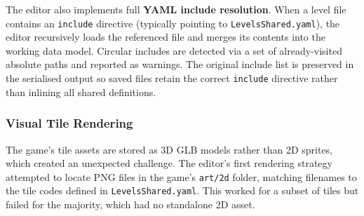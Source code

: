 \begin{Shaded}
\begin{Highlighting}[]
     
\OperatorTok{=}
        \OperatorTok{=}
     
\OperatorTok{=}
    \NormalTok{:}
\OperatorTok{=}

\StringTok{\textquotesingle{}!\textquotesingle{}}\OperatorTok{=}
\end{Highlighting}
\end{Shaded}

The editor also implements full \textbf{YAML include resolution}. When a
level file contains an \texttt{include} directive (typically pointing to
\texttt{LevelsShared.yaml}), the editor recursively loads the referenced
file and merges its contents into the working data model. Circular
includes are detected via a set of already-visited absolute paths and
reported as warnings. The original include list is preserved in the
serialised output so saved files retain the correct \texttt{include}
directive rather than inlining all shared definitions.

\subsubsection{Visual Tile Rendering}\label{visual-tile-rendering}

The game's tile assets are stored as 3D GLB models rather than 2D
sprites, which created an unexpected challenge. The editor's first
rendering strategy attempted to locate PNG files in the game's
\texttt{art/2d} folder, matching filenames to the tile codes defined in
\texttt{LevelsShared.yaml}. This worked for a subset of tiles but failed
for the majority, which had no standalone 2D asset.

